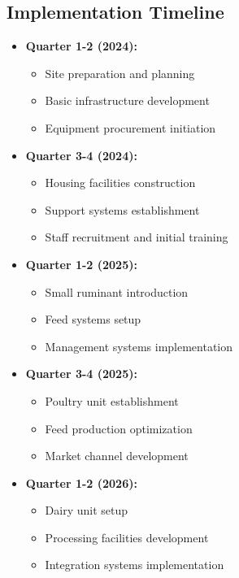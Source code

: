 \subsection{Implementation Timeline}
\begin{itemize}
    \item \textbf{Quarter 1-2 (2024):}
    \begin{itemize}
        \item Site preparation and planning
        \item Basic infrastructure development
        \item Equipment procurement initiation
    \end{itemize}
    
    \item \textbf{Quarter 3-4 (2024):}
    \begin{itemize}
        \item Housing facilities construction
        \item Support systems establishment
        \item Staff recruitment and initial training
    \end{itemize}
    
    \item \textbf{Quarter 1-2 (2025):}
    \begin{itemize}
        \item Small ruminant introduction
        \item Feed systems setup
        \item Management systems implementation
    \end{itemize}
    
    \item \textbf{Quarter 3-4 (2025):}
    \begin{itemize}
        \item Poultry unit establishment
        \item Feed production optimization
        \item Market channel development
    \end{itemize}
    
    \item \textbf{Quarter 1-2 (2026):}
    \begin{itemize}
        \item Dairy unit setup
        \item Processing facilities development
        \item Integration systems implementation
    \end{itemize}
    

\end{itemize}
